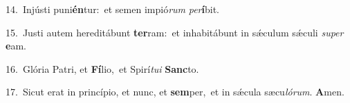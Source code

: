 {\numbfont\textcolor{\numbcolor}{14.}}~Injústi puni\-\textbf{én}\-tur:~\star et semen impió\textit{rum} \textit{per}\-\textbf{í}bit.\par
{\numbfont\textcolor{\numbcolor}{15.}}~Justi autem hereditábunt \textbf{ter}\-ram:~\star et inhabitábunt in sǽculum sǽculi \textit{su}\-\textit{per} \textbf{e}\-am.\par
{\numbfont\textcolor{\numbcolor}{16.}}~Glória Patri, et \textbf{Fí}\-lio,~\star et Spirí\-\textit{tu}\-\textit{i} \textbf{Sanc}\-to.\par
{\numbfont\textcolor{\numbcolor}{17.}}~Sicut erat in princípio, et nunc, et \textbf{sem}\-per,~\star et in sǽcula sæcu\-\textit{ló}\-\textit{rum}. \textbf{A}\-men.\par

